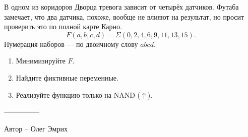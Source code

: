 \question
В одном из коридоров Дворца тревога зависит от четырёх датчиков. Футаба замечает, что два датчика, похоже, вообще не влияют на результат, но просит проверить это по полной карте Карно.
\[
F(a,b,c,d)=\Sigma(0,2,4,6,9,11,13,15).
\]
Нумерация наборов --- по двоичному слову $abcd$.
\begin{enumerate}
\item Минимизируйте $F$.
\item Найдите фиктивные переменные.
\item Реализуйте функцию только на NAND ($\uparrow$).
\end{enumerate}

---------------

Автор -- Олег Эмрих
